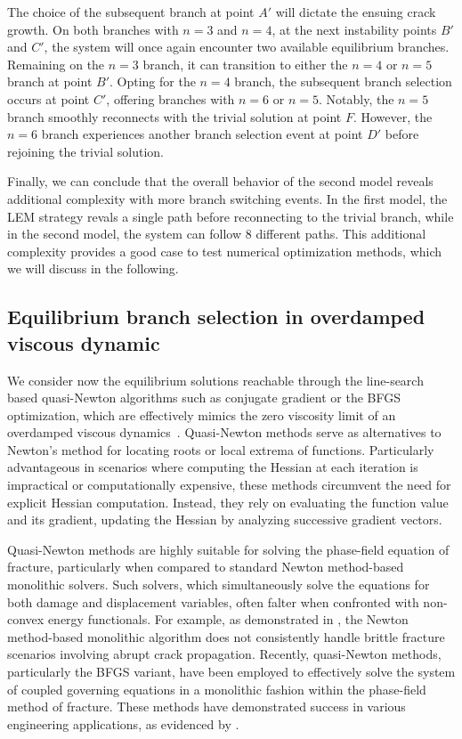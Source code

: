 The choice of the subsequent branch at point $A'$ will dictate the ensuing crack growth. On both branches with $n=3$ and $n=4$, at the next instability points $B'$ and $C'$, the system will once again encounter two available equilibrium branches. Remaining on the $n=3$ branch, it can transition to either the $n=4$ or $n=5$ branch at point $B'$. Opting for the $n=4$ branch, the subsequent branch selection occurs at point $C'$, offering branches with $n=6$ or $n=5$. Notably, the $n=5$ branch smoothly reconnects with the trivial solution at point $F$. However, the $n=6$ branch experiences another branch selection event at point $D'$ before rejoining the trivial solution. 

Finally, we can conclude that  the overall behavior of the second model   reveals additional complexity with more branch switching events. In the first model, the LEM strategy revals a single path before reconnecting to the trivial branch, while in the second model, the system can follow 8 different paths. This additional complexity provides a good case to test numerical optimization methods, which we will discuss in the following.

\subsection{Equilibrium branch selection in overdamped viscous dynamic}
We consider now the equilibrium solutions reachable through the line-search based quasi-Newton algorithms such as  conjugate gradient or the BFGS optimization, which are effectively  mimics the zero viscosity limit of an overdamped viscous dynamics~\cite{SALMAN2012219}. Quasi-Newton methods serve as alternatives to Newton's method for locating roots or local extrema of functions. Particularly advantageous in scenarios where computing the Hessian at each iteration is impractical or computationally expensive, these methods circumvent the need for explicit Hessian computation. Instead, they rely on evaluating the function value and its gradient, updating the Hessian by analyzing successive gradient vectors.

Quasi-Newton methods are highly suitable for solving the phase-field equation of fracture, particularly when compared to standard Newton method-based monolithic solvers. Such solvers, which simultaneously  solve the equations for both damage and displacement variables, often falter when confronted with non-convex energy functionals. For example, as demonstrated in \cite{Wick2017-bo}, the Newton method-based monolithic algorithm does not consistently handle brittle fracture scenarios involving abrupt crack propagation. Recently, quasi-Newton methods, particularly the BFGS variant, have been employed to effectively solve the system of coupled governing equations in a monolithic fashion within the phase-field method of fracture. These methods have demonstrated success in various engineering applications, as evidenced by \cite{Kristensen2020-zy,Wu2020-qk,Salman2021-mn,Liu2022-ix}.


